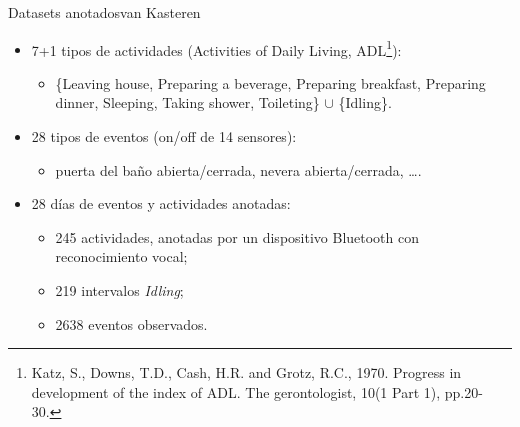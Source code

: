 \documentclass[9pt, handout]{beamer}
\begin{document}
      \begin{frame}{Datasets anotados}{van Kasteren}
        \pause
        \begin{itemize}
          \item 7+1 tipos de actividades (Activities of Daily Living, ADL\footnote{Katz, S., Downs, T.D., Cash, H.R. and Grotz, R.C., 1970. Progress in development of the index of ADL. The gerontologist, 10(1 Part 1), pp.20-30.}):
          \begin{itemize}
            \item \{Leaving house, Preparing a beverage, Preparing breakfast, Preparing dinner, Sleeping, Taking shower, Toileting\} $\cup$ \{Idling\}.
          \end{itemize}
          \pause
          \item 28 tipos de eventos (on/off de 14 sensores):
          \begin{itemize}
            \item puerta del baño abierta/cerrada, nevera abierta/cerrada, \dots.
          \end{itemize}
          \pause
          \item 28 días de eventos y actividades anotadas:
          \begin{itemize}
            \item 245 actividades, anotadas por un dispositivo Bluetooth con reconocimiento vocal;
            \item 219 intervalos \textit{Idling};
            \item 2638 eventos observados.
          \end{itemize}
        \end{itemize}
      \end{frame}
    
\end{document}
